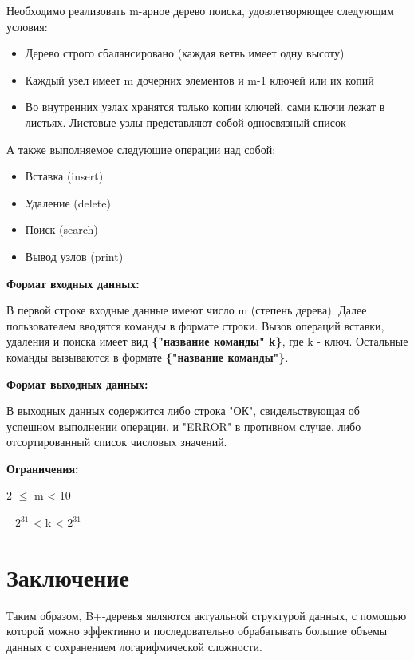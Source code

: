 \documentclass{article}
\begin{document}
Необходимо реализовать m-арное дерево поиска, удовлетворяющее следующим условия:
\begin{itemize}
\item Дерево строго сбалансировано (каждая ветвь имеет одну высоту)
\item Каждый узел имеет m дочерних элементов и m-1 ключей или их копий
\item Во внутренних узлах хранятся только копии ключей, сами ключи лежат в листьях. Листовые узлы представляют собой односвязный список
\end{itemize}

А также выполняемое следующие операции над собой:
\begin{itemize}
    \item Вставка (insert)
    \item Удаление (delete)
    \item Поиск (search)
    \item Вывод узлов (print)
\end{itemize}

\textbf{Формат входных данных:}

В первой строке входные данные имеют число m (степень дерева). Далее пользователем вводятся команды в формате строки. Вызов операций вставки, удаления и поиска имеет вид \textbf{\{"название команды" \quad k\}}, где k - ключ. Остальные команды вызываются в формате \textbf{\{"название команды"\}}.

\textbf{Формат выходных данных:}

В выходных данных содержится либо строка "ОК", свидельствующая об успешном выполнении операции, и "ERROR" в противном случае, либо отсортированный список числовых значений.

\textbf{Ограничения:}

2 $\leq$ m < 10

$-2^{31}$ < k < $2^{31}$
\section{Заключение}

Таким образом, B+-деревья являются актуальной структурой данных, с помощью которой можно эффективно и последовательно обрабатывать большие объемы данных с сохранением логарифмической сложности.
\end{document}
